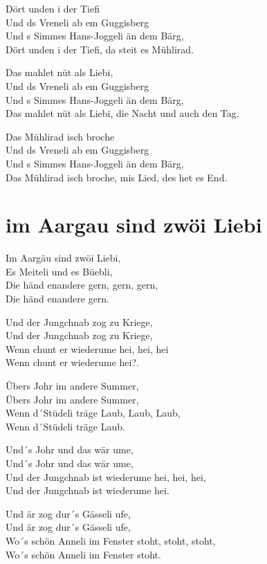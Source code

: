 \documentclass[
  letterpaper,
  twoside=false]{scrbook}
\begin{document}
Dört unden i der Tiefi\\
Und ds Vreneli ab em Guggisberg\\
Und s Simmes Hans-Joggeli än dem Bärg,\\
Dört unden i der Tiefi, da steit es Mühlirad.

Das mahlet nüt als Liebi,\\
Und ds Vreneli ab em Guggisberg\\
Und s Simmes Hans-Joggeli än dem Bärg,\\
Das mahlet nüt als Liebi, die Nacht und auch den Tag.

Das Mühlirad isch broche\\
Und ds Vreneli ab em Guggisberg\\
Und s Simmes Hans-Joggeli än dem Bärg,\\
Das Mühlirad isch broche, mis Lied, des het es End.

\hypertarget{im-aargau-sind-zwuxf6i-liebi}{%
\chapter{im Aargau sind zwöi Liebi}\label{im-aargau-sind-zwuxf6i-liebi}}

Im Aargäu sind zwöi Liebi,\\
Es Meiteli und es Büebli,\\
Die händ enandere gern, gern, gern,\\
Die händ enandere gern.

Und der Jungchnab zog zu Kriege,\\
Und der Jungchnab zog zu Kriege,\\
Wenn chunt er wiederume hei, hei, hei\\
Wenn chunt er wiederume hei?.

Übers Johr im andere Summer,\\
Übers Johr im andere Summer,\\
Wenn d´Stüdeli träge Laub, Laub, Laub,\\
Wenn d´Stüdeli träge Laub.

Und´s Johr und das wär ume,\\
Und´s Johr und das wär ume,\\
Und der Jungchnab ist wiederume hei, hei, hei,\\
Und der Jungchnab ist wiederume hei.

Und är zog dur´s Gässeli ufe,\\
Und är zog dur´s Gässeli ufe,\\
Wo´s schön Anneli im Fenster stoht, stoht, stoht,\\
Wo´s schön Anneli im Fenster stoht.
\end{document}
